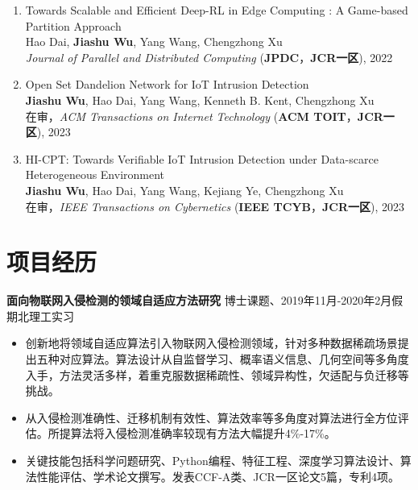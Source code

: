 \documentclass[UTF8,letterpaper,11pt]{article}
\begin{document}
\begin{enumerate}
  \item Towards Scalable and Efficient Deep-RL in Edge Computing : A Game-based Partition Approach\\
  Hao Dai, \textbf{Jiashu Wu}, Yang Wang\textsuperscript{\Letter}, Chengzhong Xu\\
  \textit{Journal of Parallel and Distributed Computing} (\textbf{JPDC}，\textbf{JCR一区}), 2022

  \item Open Set Dandelion Network for IoT Intrusion Detection\\
  \textbf{Jiashu Wu}, Hao Dai, Yang Wang\textsuperscript{\Letter}, Kenneth B. Kent, Chengzhong Xu\\
  在审，\textit{ACM Transactions on Internet Technology} (\textbf{ACM TOIT}，\textbf{JCR一区}), 2023
  
  \item HI-CPT: Towards Verifiable IoT Intrusion Detection under Data-scarce Heterogeneous Environment\\
  \textbf{Jiashu Wu}, Hao Dai, Yang Wang\textsuperscript{\Letter}, Kejiang Ye, Chengzhong Xu\\
  在审，\textit{IEEE Transactions on Cybernetics} (\textbf{IEEE TCYB}，\textbf{JCR一区}), 2023
\end{enumerate}




\section{\textbf{项目经历}}

\textbf{面向物联网入侵检测的领域自适应方法研究} \hfill 博士课题、2019年11月-2020年2月假期北理工实习

\begin{itemize}
  \setlength\itemsep{2pt}
  \item 创新地将领域自适应算法引入物联网入侵检测领域，针对多种数据稀疏场景提出五种对应算法。算法设计从自监督学习、概率语义信息、几何空间等多角度入手，方法灵活多样，着重克服数据稀疏性、领域异构性，欠适配与负迁移等挑战。
  \item 从入侵检测准确性、迁移机制有效性、算法效率等多角度对算法进行全方位评估。所提算法将入侵检测准确率较现有方法大幅提升4\%-17\%。
  \item 关键技能包括科学问题研究、Python编程、特征工程、深度学习算法设计、算法性能评估、学术论文撰写。发表CCF-A类、JCR一区论文5篇，专利4项。
\end{itemize}
\end{document}

